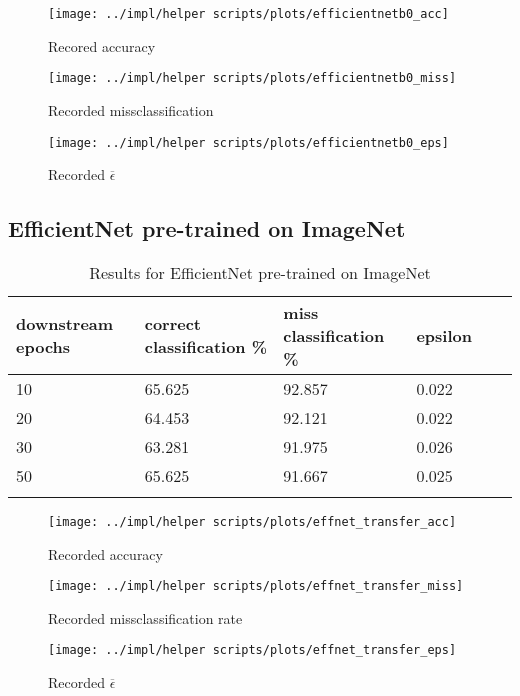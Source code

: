 \begin{figure}[h]
    \caption{Recored accuracy}
    \centering
    \texttt{[image: ../impl/helper scripts/plots/efficientnetb0\_acc]}
\end{figure}

\begin{figure}[h]
    \caption{Recorded missclassification}
    \centering
    \texttt{[image: ../impl/helper scripts/plots/efficientnetb0\_miss]}
\end{figure}

\begin{figure}[h]
    \caption{Recorded $\overline{\epsilon}$}
    \centering
    \texttt{[image: ../impl/helper scripts/plots/efficientnetb0\_eps]}
\end{figure}

\subsection{EfficientNet pre-trained on ImageNet}

\begin{longtable}{|| p{} | p{} | p{} | p{} | p{} | p{} ||}
    \hline \hline
    downstream epochs & correct classification \% & miss classification \% & epsilon \\ \hline \hline

    10                & 65.625                    & 92.857                 & 0.022   \\ \hline
    20                & 64.453                    & 92.121                 & 0.022   \\ \hline
    30                & 63.281                    & 91.975                 & 0.026   \\ \hline
    50                & 65.625                    & 91.667                 & 0.025   \\ \hline

    \caption{\label{tab:table3}Results for EfficientNet pre-trained on ImageNet}
\end{longtable}



\begin{figure}[h]
    \caption{Recorded accuracy}
    \centering
    \texttt{[image: ../impl/helper scripts/plots/effnet\_transfer\_acc]}
\end{figure}

\begin{figure}[h]
    \caption{Recorded missclassification rate}
    \centering
    \texttt{[image: ../impl/helper scripts/plots/effnet\_transfer\_miss]}
\end{figure}

\begin{figure}[h]
    \caption{Recorded $\overline{\epsilon}$}
    \centering
    \texttt{[image: ../impl/helper scripts/plots/effnet\_transfer\_eps]}
\end{figure}




